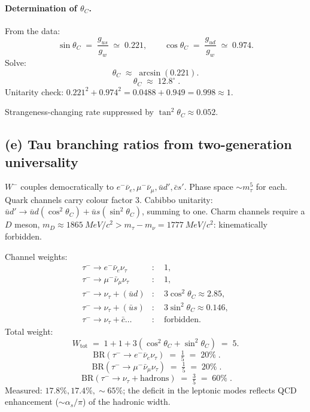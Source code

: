 \documentclass[11pt]{article}
\begin{document}
\paragraph{Determination of $\theta_{C}$.} From the data:
\[
\sin\theta_{C}\;=\;\frac{g_{us}}{g_{w}}\;\simeq\;0.221,\qquad\cos\theta_{C}\;=\;\frac{g_{ud}}{g_{w}}\;\simeq\;0.974.
\]
Solve:
\[
\theta_{C}\;\approx\;\arcsin(0.221).
\]
\begin{equation}
\boxed{\;\theta_{C}\;\approx\;12.8^{\circ}\;.}
\label{eq:thetaC-numbers}
\end{equation}
Unitarity check: $0.221^{2}+0.974^{2}=0.0488+0.949=0.998\approx 1$.

Strangeness-changing rate suppressed by $\tan^{2}\theta_{C}\approx 0.052$.

\subsection*{(e) Tau branching ratios from two-generation universality}

$W^{-}$ couples democratically to $e^{-}\bar\nu_{e},\mu^{-}\bar\nu_{\mu},\bar u d',\bar c s'$. Phase space $\sim m_{\tau}^{5}$ for each. Quark channels carry colour factor 3. Cabibbo unitarity: $\bar u d'\to\bar u d(\cos^{2}\theta_{C})+\bar u s(\sin^{2}\theta_{C})$, summing to one. Charm channels require a $D$ meson, $m_{D}\approx\SI{1865}{MeV/c^{2}}>m_{\tau}-m_{\nu}=\SI{1777}{MeV/c^{2}}$: kinematically forbidden.

Channel weights:
\begin{equation}
\begin{aligned}
\tau^{-}\to e^{-}\bar\nu_{e}\nu_{\tau}&:\quad 1,\\
\tau^{-}\to\mu^{-}\bar\nu_{\mu}\nu_{\tau}&:\quad 1,\\
\tau^{-}\to\nu_{\tau}+(\bar u d)&:\quad 3\cos^{2}\theta_{C}\approx 2.85,\\
\tau^{-}\to\nu_{\tau}+(\bar u s)&:\quad 3\sin^{2}\theta_{C}\approx 0.146,\\
\tau^{-}\to\nu_{\tau}+\bar c\dots&:\quad\text{forbidden}.
\end{aligned}
\label{eq:tau-channels}
\end{equation}
Total weight:
\[
W_\text{tot}\;=\;1+1+3(\cos^{2}\theta_{C}+\sin^{2}\theta_{C})\;=\;5.
\]
\begin{equation}
\boxed{\;\text{BR}(\tau^{-}\to e^{-}\bar\nu_{e}\nu_{\tau})\;=\;\tfrac{1}{5}\;=\;20\%\;.}
\label{eq:BR-e}
\end{equation}
\begin{equation}
\boxed{\;\text{BR}(\tau^{-}\to\mu^{-}\bar\nu_{\mu}\nu_{\tau})\;=\;\tfrac{1}{5}\;=\;20\%\;.}
\label{eq:BR-mu}
\end{equation}
\begin{equation}
\boxed{\;\text{BR}(\tau^{-}\to\nu_{\tau}+\text{hadrons})\;=\;\tfrac{3}{5}\;=\;60\%\;.}
\label{eq:BR-had}
\end{equation}
Measured: $17.8\%,17.4\%,\sim 65\%$; the deficit in the leptonic modes reflects QCD enhancement ($\sim\alpha_{s}/\pi$) of the hadronic width.
\end{document}
